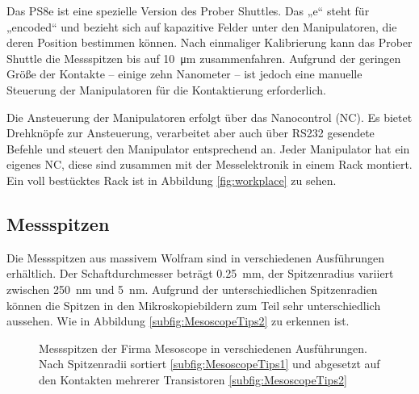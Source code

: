 Das PS8e ist eine spezielle Version des Prober Shuttles. Das „e“ steht für „encoded“ und bezieht sich auf kapazitive Felder unter den Manipulatoren, die deren Position bestimmen können. Nach einmaliger Kalibrierung kann das Prober Shuttle die Messspitzen bis auf \SI{10}{\micro\metre} zusammenfahren. Aufgrund der geringen Größe der Kontakte – einige zehn Nanometer – ist jedoch eine manuelle Steuerung der Manipulatoren für die Kontaktierung erforderlich.

Die Ansteuerung der Manipulatoren erfolgt über das Nanocontrol (NC). Es bietet Drehknöpfe zur Ansteuerung, verarbeitet aber auch über RS232 gesendete Befehle und steuert den Manipulator entsprechend an. Jeder Manipulator hat ein eigenes NC, diese sind zusammen mit der Messelektronik in einem Rack montiert. Ein voll bestücktes Rack ist in Abbildung \ref{fig:workplace} zu sehen.

\subsection{Messspitzen}
Die Messspitzen aus massivem Wolfram sind in verschiedenen Ausführungen erhältlich. Der Schaftdurchmesser beträgt \SI{0,25}{\milli\metre}, der Spitzenradius variiert zwischen \SI{250}{\nano\metre} und \SI{5}{\nano\metre}. Aufgrund der unterschiedlichen Spitzenradien können die Spitzen in den Mikroskopiebildern zum Teil sehr unterschiedlich aussehen. Wie in Abbildung \ref{subfig:MesoscopeTips2} zu erkennen ist.
\begin{figure}[h]
\centerline{
\hfill
{}}
\caption{Messspitzen der Firma Mesoscope in verschiedenen Ausführungen. Nach Spitzenradii sortiert \ref{subfig:MesoscopeTips1} und abgesetzt auf den Kontakten mehrerer Transistoren \ref{subfig:MesoscopeTips2}}
\label{fig:MesoscopeTips}
\begin{small}
\end{small}
\end{figure}
\newpage
